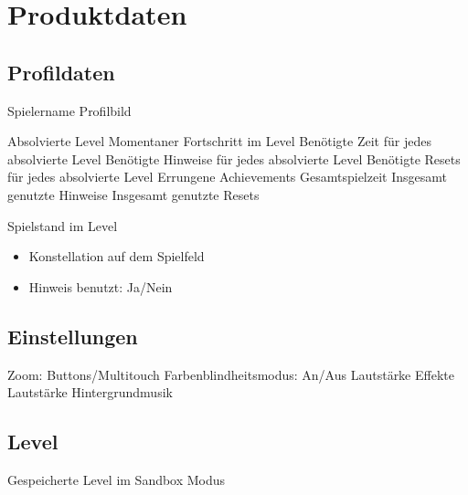 \section{Produktdaten}

\subsection{Profildaten}
\begin{requirements}
	\begin{requirements}
		 Spielername
		 Profilbild
	\end{requirements}
	
	\req [Spielfortschritt] {D20}
	\begin{requirements}
		 Absolvierte Level
		 Momentaner Fortschritt im Level
		 Benötigte Zeit für jedes absolvierte Level
		 Benötigte Hinweise für jedes absolvierte Level
		 Benötigte Resets für jedes absolvierte Level
		 Errungene Achievements
		 Gesamtspielzeit
		 Insgesamt genutzte Hinweise
		 Insgesamt genutzte Resets
	\end{requirements}
	 Spielstand im Level
	\begin{itemize}
		\item Konstellation auf dem Spielfeld
		\item Hinweis benutzt: Ja/Nein
	\end{itemize}
\end{requirements}

\subsection{Einstellungen}
\begin{requirements}
	 Zoom: Buttons/Multitouch
	 Farbenblindheitsmodus: An/Aus
	 Lautstärke Effekte
	 Lautstärke Hintergrundmusik
	
\end{requirements}

\subsection{Level}
\begin{requirements}
	 Gespeicherte Level im Sandbox Modus
\end{requirements}
	
